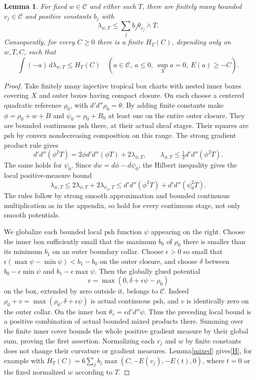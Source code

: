 \documentclass[11pt]{article}
\newcommand{\DD}{d'd''}
\newcommand{\C}{\mathcal C}
\newtheorem{lemma}[theorem]{Lemma}
\theoremstyle{remark}\newtheorem{remark}[theorem]{Remark}
\begin{document}
\begin{lemma}\label{gradom}
For fixed $w\in\C$ and either such $T$, there are finitely many
bounded $v_j\in\C$ and positive constants $b_j$ with
\[
 \lambda_{w,T}\le\sum_jb_j\theta_{v_j}\wedge T.
\]
Consequently, for every $C\ge0$ there is a finite $H_T(C)$,
depending only on $w,T,C$, such that
\begin{equation}\label{H}
 \int(-a)\,d\lambda_{w,T}\le H_T(C)
 \quad(a\in\C,\ a\le0,\ \sup_Xa=0,\ E(a)\ge-C).
\end{equation}
\end{lemma}
\begin{proof}
Take finitely many injective tropical box charts with nested
inner boxes covering $X$ and outer boxes having compact closure.
On each choose a centered quadratic reference $\rho_0$, with
$\DD\rho_0=\theta$. By adding finite constants make
$\phi=\rho_0+w+B$ and $\psi_0=\rho_0+B_0$ at least one
on the entire outer closure. They are bounded continuous psh
there, at their actual sheaf stages. Their squares are psh by
convex nondecreasing composition on this range. The strong
gradient product rule gives
\[
 \DD(\phi^2T)=2\phi\DD(\phi T)+2\lambda_{\phi,T},
 \qquad \lambda_{\phi,T}\le\tfrac12\DD(\phi^2T).
\]
The same holds for $\psi_0$. Since $dw=d\phi-d\psi_0$,
the Hilbert inequality gives the local positive-measure bound
\[
 \lambda_{w,T}\le2\lambda_{\phi,T}+2\lambda_{\psi_0,T}
 \le\DD(\phi^2T)+\DD(\psi_0^2T).
\]
The rules follow by strong smooth approximation and bounded
continuous multiplication as in the appendix, so hold for every
continuous stage, not only smooth potentials.

We globalize each bounded local psh function $\psi$ appearing
on the right. Choose the inner box sufficiently small that the
maximum $b_0$ of $\rho_0$ there is smaller than its minimum
$b_1$ on an outer boundary collar. Choose $\epsilon>0$ so small
that $\epsilon(\max\psi-\min\psi)<b_1-b_0$ on the outer
closure, and choose $\delta$ between
$b_0-\epsilon\min\psi$ and $b_1-\epsilon\max\psi$.
Then the globally glued potential
\[
 v=\max(0,\delta+\epsilon\psi-\rho_0)
\]
on the box, extended by zero outside it, belongs to $\C$.
Indeed $\rho_0+v=\max(\rho_0,\delta+\epsilon\psi)$ is
actual continuous psh, and $v$ is identically zero on the outer
collar. On the inner box $\theta_v=\epsilon\DD\psi$.
Thus the preceding local bound is a positive combination of
actual bounded mixed products there. Summing over the finite
inner cover bounds the whole positive gradient measure by their
global sum, proving the first assertion. Normalizing each $v_j$
and $w$ by finite constants does not change their curvature or
gradient measures. Lemma\ref{mixed} gives\eqref{H}, for example
with $H_T(C)=6\sum_jb_j\max(C,-E(v_j),-E(t),0)$, where
$t=0$ or the fixed normalized $w$ according to $T$.
\end{proof}
\end{document}
